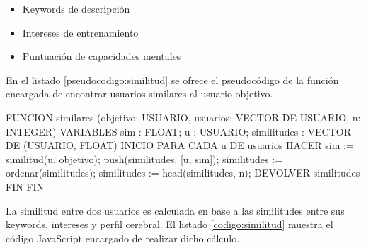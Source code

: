 \begin{itemize}
\item Keywords de descripción
\item Intereses de entrenamiento
\item Puntuación de capacidades mentales
\end{itemize}

En el listado \ref{pseudocodigo:similitud} se ofrece el pseudocódigo de la función encargada de encontrar usuarios similares al usuario objetivo.

\begin{listing}[caption=Función que encuentra usuarios similares al objetivo, label=pseudocodigo:similitud]
FUNCION similares (objetivo: USUARIO, usuarios: VECTOR DE USUARIO, n: INTEGER)
VARIABLES
    sim : FLOAT;
    u : USUARIO;
    similitudes : VECTOR DE (USUARIO, FLOAT)
INICIO
    PARA CADA u DE usuarios HACER
        sim := similitud(u, objetivo);
        push(similitudes, [u, sim]);
        similitudes := ordenar(similitudes);
        similitudes := head(similitudes, n);
        DEVOLVER similitudes
    FIN
FIN
\end{listing}

La similitud entre dos usuarios es calculada en base a las similitudes entre sus keywords, intereses y perfil cerebral. El listado \ref{codigo:similitud} muestra el código JavaScript encargado de realizar dicho cálculo.


